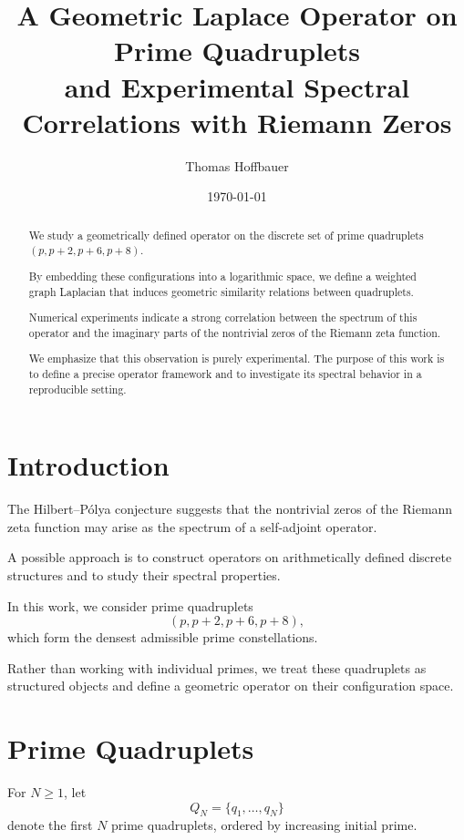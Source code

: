 \documentclass[11pt]{article}
\title{
	A Geometric Laplace Operator on Prime Quadruplets\\
	and Experimental Spectral Correlations with Riemann Zeros
}
\author{
	Thomas Hoffbauer
}
\date{\today}
\begin{document}
	
	\maketitle
	
	\begin{abstract}
		We study a geometrically defined operator on the discrete set of prime quadruplets $(p, p+2, p+6, p+8)$.
		
		By embedding these configurations into a logarithmic space, we define a weighted graph Laplacian that induces geometric similarity relations between quadruplets.
		
		Numerical experiments indicate a strong correlation between the spectrum of this operator and the imaginary parts of the nontrivial zeros of the Riemann zeta function.
		
		We emphasize that this observation is purely experimental. The purpose of this work is to define a precise operator framework and to investigate its spectral behavior in a reproducible setting.
	\end{abstract}
	
	\section{Introduction}
	
	The Hilbert--Pólya conjecture suggests that the nontrivial zeros of the Riemann zeta function may arise as the spectrum of a self-adjoint operator.
	
	A possible approach is to construct operators on arithmetically defined discrete structures and to study their spectral properties.
	
	In this work, we consider prime quadruplets
	\[
	(p, p+2, p+6, p+8),
	\]
	which form the densest admissible prime constellations.
	
	Rather than working with individual primes, we treat these quadruplets as structured objects and define a geometric operator on their configuration space.
	
	\section{Prime Quadruplets}
	
	For $N \ge 1$, let
	\[
	Q_N = \{q_1, \dots, q_N\}
	\]
	denote the first $N$ prime quadruplets, ordered by increasing initial prime.
	
\end{document}
